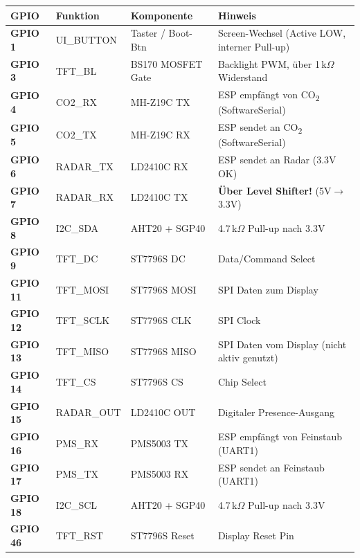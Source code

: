 \documentclass[a4paper,11pt]{article}
\begin{document}
\begin{longtable}{p{1.8cm} p{3cm} p{3cm} p{5cm}}
\toprule
\rowcolor{tableheader}
\textbf{GPIO} & \textbf{Funktion} & \textbf{Komponente} & \textbf{Hinweis} \\
\midrule
\endhead
\textbf{GPIO\,1}  & UI\_BUTTON   & Taster / Boot-Btn & Screen-Wechsel (Active LOW, interner Pull-up) \\
\textbf{GPIO\,3}  & TFT\_BL      & BS170 MOSFET Gate  & Backlight PWM, über 1\,k$\Omega$ Widerstand \\
\textbf{GPIO\,4}  & CO2\_RX      & MH-Z19C TX         & ESP empfängt von CO\textsubscript{2} (SoftwareSerial) \\
\textbf{GPIO\,5}  & CO2\_TX      & MH-Z19C RX         & ESP sendet an CO\textsubscript{2} (SoftwareSerial) \\
\textbf{GPIO\,6}  & RADAR\_TX    & LD2410C RX         & ESP sendet an Radar (3.3V OK) \\
\textbf{GPIO\,7}  & RADAR\_RX    & LD2410C TX         & \textbf{Über Level Shifter!} (5V$\rightarrow$3.3V) \\
\textbf{GPIO\,8}  & I2C\_SDA     & AHT20 + SGP40      & 4.7\,k$\Omega$ Pull-up nach 3.3V \\
\textbf{GPIO\,9}  & TFT\_DC      & ST7796S DC          & Data/Command Select \\
\textbf{GPIO\,11} & TFT\_MOSI    & ST7796S MOSI        & SPI Daten zum Display \\
\textbf{GPIO\,12} & TFT\_SCLK    & ST7796S CLK         & SPI Clock \\
\textbf{GPIO\,13} & TFT\_MISO    & ST7796S MISO        & SPI Daten vom Display (nicht aktiv genutzt) \\
\textbf{GPIO\,14} & TFT\_CS      & ST7796S CS          & Chip Select \\
\textbf{GPIO\,15} & RADAR\_OUT   & LD2410C OUT         & Digitaler Presence-Ausgang \\
\textbf{GPIO\,16} & PMS\_RX      & PMS5003 TX          & ESP empfängt von Feinstaub (UART1) \\
\textbf{GPIO\,17} & PMS\_TX      & PMS5003 RX          & ESP sendet an Feinstaub (UART1) \\
\textbf{GPIO\,18} & I2C\_SCL     & AHT20 + SGP40       & 4.7\,k$\Omega$ Pull-up nach 3.3V \\
\textbf{GPIO\,46} & TFT\_RST     & ST7796S Reset        & Display Reset Pin \\
\bottomrule
\end{longtable}
\end{document}
